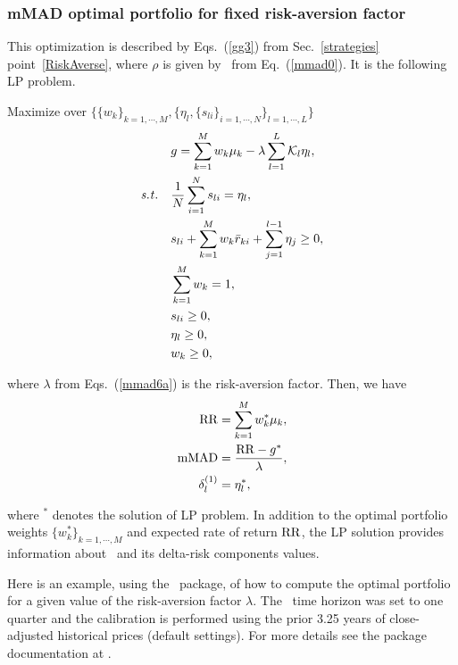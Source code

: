 

\BackToContents

\subsubsection{mMAD optimal portfolio for fixed risk-aversion factor}
This optimization is described by Eqs.~(\ref{gg3}) from Sec.~\ref{strategies} point~\ref{RiskAverse},
where $\rho$ is given by \mMAD\ from Eq.~(\ref{mmad0}).
It is the following LP problem.

\bigskip
\noindent Maximize over $\{ \{w_k\}_{k=1,\cdots,M}, \{ \eta_l, \{ s_{li} \}_{i=1,\cdots,N} \}_{l=1,\cdots,L} \}$
\begin{subequations}\label{mmad6}
\begin{align}
    &g = \sum_{k=1}^M w_k\mu_k - \lambda \sum_{l=1}^L \cK_l \eta_l, \label{mmad6a} \\
    \st &\frac{1}{N} \sum_{i=1}^N s_{li} = \eta_l, \label{mmad6b} \\
        &s_{li} + \sum_{k=1}^M w_k \br_{ki} + \sum_{j=1}^{l-1} \eta_j \geq 0, \label{mmad6c} \\
        &\sum_{k=1}^M w_k = 1, \label{mmad6d} \\
        & s_{li} \geq 0, \label{mmad6e} \\
        &\eta_l \geq 0, \label{mmad6g} \\
        & w_k \geq 0, \label{mmad6f}
\end{align}
\end{subequations}

\noindent where $\lambda$ from Eqs.~(\ref{mmad6a}) is the risk-aversion factor.
Then, we have
\begin{subequations}\label{mmad7}
\begin{align}
    \RR &= \sum_{k=1}^M w_k^* \mu_k, \label{mmad7a} \\
    \mMAD &= \frac{\RR - g^*}{\lambda}, \label{mmad7b} \\
    \delta^{(1)}_l &= \eta_l^*, \label{mmad7c}
\end{align}
\end{subequations}

\noindent where $^*$ denotes the solution of LP problem.
In addition to the optimal portfolio weights $\{w_k^*\}_{k=1,\cdots,M}$ and expected rate of return ${\rm RR}$,
the LP solution provides information about \mMAD\ and its delta-risk components values.

\bigskip
\noindent Here is an example, using the \azapy\ package, of how to compute the optimal portfolio
for a given value of the risk-aversion factor $\lambda$.
The \mMAD\ time horizon was set to one quarter and the calibration is performed using the prior 3.25 years of
close-adjusted historical prices (default settings).
For more details see the package documentation at \azapydoc.

